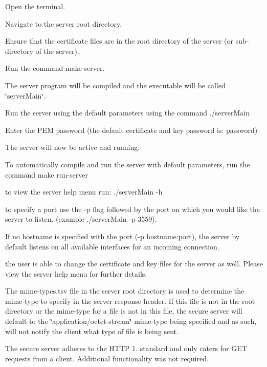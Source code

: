 \begin{DoxyEnumerate}
\item Open the terminal.
\item Navigate to the server root directory.
\item Ensure that the certificate files are in the root directory of the server (or sub-\/directory of the server).
\item Run the command make server.
\item The server program will be compiled and the executable will be called \char`\"{}server\+Main\char`\"{}.
\item Run the server using the default parameters using the command ./server\+Main
\item Enter the P\+EM password (the default certificate and key password is\+: \textquotesingle{}password\textquotesingle{})
\item The server will now be active and running.
\end{DoxyEnumerate}
\begin{DoxyItemize}
\item To automatically compile and run the server with default parameters, run the command make run-\/server
\begin{DoxyItemize}
\item to view the server help menu run\+: ./server\+Main -\/h
\item to specify a port use the -\/p flag followed by the port on which you would like the server to listen. (example ./server\+Main -\/p 3559).
\end{DoxyItemize}
\item If no hostname is specified with the port (-\/p hostname\+:port), the server by default listens on all available interfaces for an incoming connection.
\item the user is able to change the certificate and key files for the server as well. Please view the server help menu for further details.
\item The mime-\/types.\+tsv file in the server root directory is used to determine the mime-\/type to specify in the server response header. If this file is not in the root directory or the mime-\/type for a file is not in this file, the secure server will default to the \char`\"{}application/octet-\/stream\char`\"{} mime-\/type being specified and as such, will not notify the client what type of file is being sent.
\item The secure server adheres to the H\+T\+TP 1. standard and only caters for G\+ET requests from a client. Additional functionality was not required.
\end{DoxyItemize}



